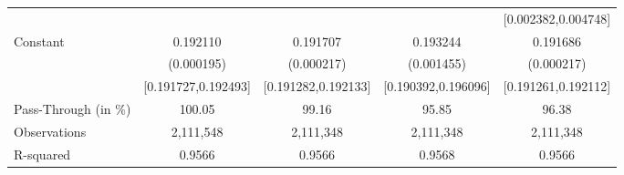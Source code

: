 {\begin{tabular}{l*{4}{c}}
                    &                     &                     &                     &[0.002382,0.004748]         \\
Constant            &    0.192110\sym{***}&    0.191707\sym{***}&    0.193244\sym{***}&    0.191686\sym{***}\\
                    &  (0.000195)         &  (0.000217)         &  (0.001455)         &  (0.000217)         \\
                    &[0.191727,0.192493]         &[0.191282,0.192133]         &[0.190392,0.196096]         &[0.191261,0.192112]         \\
\midrule
Pass-Through (in \%)&      100.05         &       99.16         &       95.85         &       96.38         \\
Observations        &   2,111,548         &   2,111,348         &   2,111,348         &   2,111,348         \\
R-squared           &      0.9566         &      0.9566         &      0.9568         &      0.9566         \\
\bottomrule
\end{tabular}
}

